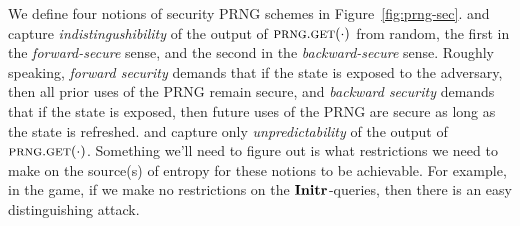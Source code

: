 We define four notions of security PRNG schemes in Figure~\ref{fig:prng-sec}.
%
\indfwd and \indbwd capture \emph{indistingushibility} of the output of
$\textsc{prng}.\textsc{get}(\cdot)$ from random, the first in the \emph{forward-secure} sense,
and the second in the \emph{backward-secure} sense.
%
Roughly speaking, \emph{forward security} demands that if the state is exposed
to the adversary, then all prior uses of the PRNG remain secure, and
\emph{backward security} demands that if the state is exposed, then future uses
of the PRNG are secure as long as the state is refreshed.
%
\upfwd and \upbwd capture only \emph{unpredictability} of the output of
$\textsc{prng}.\textsc{get}(\cdot)$.
%
Something we'll need to figure out is what restrictions we need to make
on the source(s) of entropy for these notions to be achievable. For example, in
the \indfwd game, if we make no restrictions on the $\mathbf{Initr}\hspace{0.5pt}$-queries, then
there is an easy distinguishing attack.

